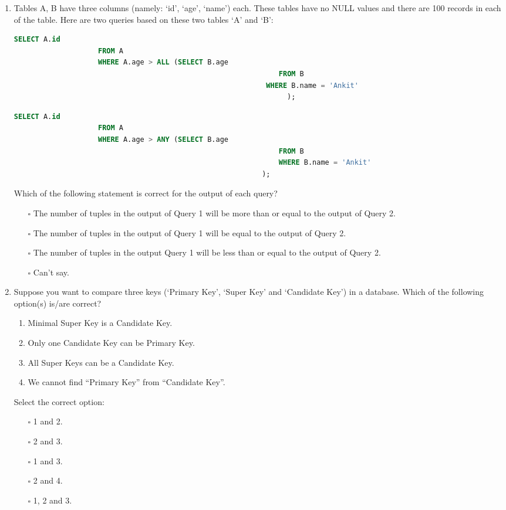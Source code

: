\documentclass[10pt]{article}
\begin{document}
\begin{enumerate}
			\item Tables A, B have three columns (namely: ‘id’, ‘age’, ‘name’) each. These tables have no NULL values and there are 100 records in each of the table. Here are two queries based on these two tables ‘A’ and ‘B’:
				\begin{lstlisting}[language=SQL,firstline=1, lastline=6] 
					SELECT A.id 
					FROM A 
					WHERE A.age > ALL (SELECT B.age 
												    	       FROM B 
												            WHERE B.name = 'Ankit'
														         );
				\end{lstlisting}
				\begin{lstlisting}[language=SQL,firstline=1, lastline=6] 
					SELECT A.id 
					FROM A 
					WHERE A.age > ANY (SELECT B.age 
													           FROM B 
													           WHERE B.name = 'Ankit'
												           );
				\end{lstlisting}
				Which of the following statement is correct for the output of each query?
				\begin{enumerate}
					\item[$\square$] The number of tuples in the output of Query 1 will be more than or equal to the output of Query 2.
					\item[$\square$] The number of tuples in the output of Query 1 will be equal to the output of Query 2.
					\item[$\square$] The number of tuples in the output Query 1 will be less than or equal to the output of Query 2.
					\item[$\square$] Can’t say.
				\end{enumerate}

			\item Suppose you want to compare three keys (‘Primary Key’, ‘Super Key’ and ‘Candidate Key’) in a database. Which of the following option(s) is/are correct?
				\begin{enumerate}
					\item Minimal Super Key is a Candidate Key.
					\item Only one Candidate Key can be Primary Key.
					\item All Super Keys can be a Candidate Key.
					\item We cannot find “Primary Key” from “Candidate Key”.
				\end{enumerate}
				Select the correct option:
				\begin{enumerate}
					\item[$\square$] 1 and 2.
					\item[$\square$] 2 and 3.
					\item[$\square$] 1 and 3.
					\item[$\square$] 2 and 4.
					\item[$\square$] 1, 2 and 3.
				\end{enumerate}
			

\end{enumerate}
\end{document}
